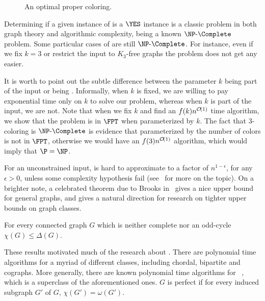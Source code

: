 \begin{figure}[!htb]
    \centering
    \caption{An optimal proper coloring.}
    \label{fig:prop_color}
\end{figure}

Determining if a given instance of  is a $\YES$ instance is a classic problem in both graph theory and algorithmic complexity, being a known $\NPc$ problem.
Some particular cases of  are still $\NPc$.
For instance, even if we fix $k=3$ or restrict the input to $K_3$-free graphs the problem does not get any easier.

It is worth to point out the subtle difference between the parameter $k$ being part of the input or being .
Informally, when $k$ is fixed, we are willing to pay exponential time only on $k$ to solve our problem, whereas when $k$ is part of the input, we are not.
Note that when we fix $k$ and find an $f(k)n^{\mathcal{O}\!\left(1\right)}$ time algorithm, we show that the problem is in $\FPT$ when parameterized by $k$.
The fact that $3$-coloring is $\NPc$ is evidence that  parameterized by the number of colors is not in $\FPT$, otherwise we would have an $f(3)n^{\mathcal{O}\!\left(1\right)}$ algorithm, which would imply that $\P = \NP$. 

For an unconstrained input,  is hard to approximate to a factor of $n^{1-\epsilon}$, for any $\epsilon > 0$, unless some complexity hypothesis fail (see~\citep{color_zpp} for more on the topic).
On a brighter note, a celebrated theorem due to Brooks in~\citep{brooks_theorem} gives a nice upper bound for general graphs, and gives a natural direction for research on tighter upper bounds on graph classes.

\begin{theorem*}
    For every connected graph $G$ which is neither complete nor an odd-cycle $\chi(G) \leq \Delta(G)$.
\end{theorem*}

These results motivated much of the research about .
There are polynomial time algorithms for a myriad of different classes, including chordal, bipartite and cographs.
More generally, there are known polynomial time algorithms for ~\citep{perfect_polynomial}, which is a superclass of the aforementioned ones.
$G$ is perfect if for every induced subgraph $G'$ of $G$, $\chi(G') = \omega(G')$.

